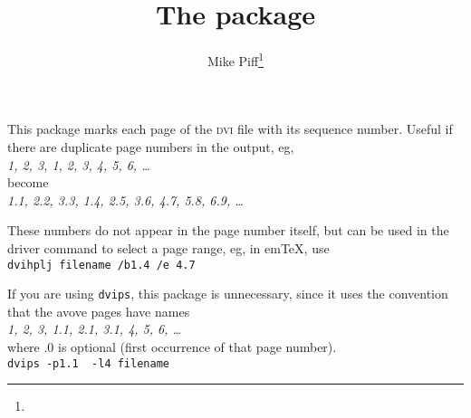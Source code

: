 \documentclass[pagesize=auto, fontsize=14pt, parskip=half, DIV=10]{scrartcl}
\title{The \pkg{duplicat} package}
\author{Mike Piff\thanks{\mail{M.Piff@sheffield.ac.uk}}}
\date{}
\begin{document}
\maketitle

\noindent
This package marks each page of the \textsc{dvi} file with its sequence number.
Useful if there are duplicate page numbers in the output, eg,\\
\textit{1, 2, 3, 1, 2, 3, 4, 5, 6, \dots}\\
become\\
\textit{1.1, 2.2, 3.3, 1.4, 2.5, 3.6, 4.7, 5.8, 6.9, \dots}

These numbers do not appear in the page number itself, but can be used
in the driver command to select a page range, eg, in em\TeX, use\\
\verb|dvihplj filename /b1.4 /e 4.7|

If you are using \texttt{dvips}, this package is unnecessary, since it uses the
convention that the avove pages have names\\
\textit{1, 2, 3, 1.1, 2.1, 3.1, 4, 5, 6, \dots}\\
where .0 is optional (first occurrence of that page number).\\
\verb|dvips -p1.1  -l4 filename|
\end{document}
